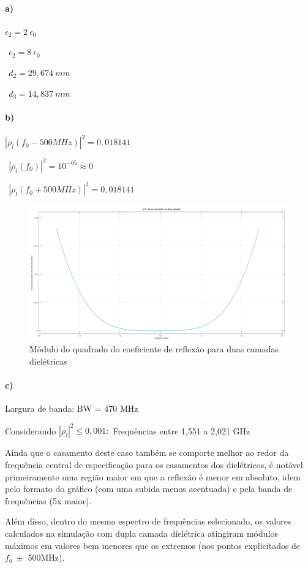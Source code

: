 \documentclass[12pt,a4paper]{article}
\begin{document}
\paragraph{a)}

$\epsilon_2=2\ \epsilon_0$

$\ \ \epsilon_2=8\ \epsilon_0$

$\ \ d_2 = 29,674\ mm$

$\ \ d_3 = 14,837\ mm$

\paragraph{b)}

$|\rho_l(f_0-500MHz)|^2=0,018141$

$\ \ |\rho_l(f_0)|^2=10^{-65}\approx 0$

$\ \ |\rho_l(f_0+500MHz)|^2=0,018141$

\begin{center}
    \begin{figure}[h]
    \hspace{-25pt}
    \includegraphics[width=1.1\textwidth]{double.png}

    \caption{Módulo do quadrado do coeficiente de reflexão para duas camadas dielétricas}
    \label{fig:awesome_image_2}
    
    \end{figure}
\end{center}

\vspace{-1.5cm}

\paragraph{c)}

Largura de banda: BW = 470 MHz

Considerando $|\rho_l|^2 \le 0,001:$ Frequências entre 1,551 a 2,021 GHz

\newpage

Ainda que o casamento deste caso também se comporte melhor ao redor da frequência central de especificação para os casamentos dos dielétricos, é notável primeiramente uma região maior em que a reflexão é menor em absoluto, idem pelo formato do gráfico (com uma subida menos acentuada) e pela banda de frequências (5x maior).

Além disso, dentro do mesmo espectro de frequências selecionado, os valores calculados na simulação com dupla camada dielétrica atingiram módulos máximos em valores bem menores que os extremos (nos pontos explicitados de $f_0\ \pm$ 500MHz).
\end{document}
